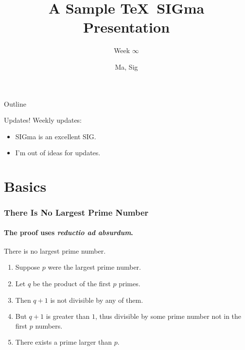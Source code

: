 \documentclass[aspectratio=169]{beamer}
\title{A Sample \TeX\ SIGma Presentation}
\subtitle{Week $\infty$}
\author{Ma, Sig}
\date{}
\begin{document}

\begin{frame}
\titlepage
\end{frame}

\begin{frame}{Outline}
  \tableofcontents
\end{frame}

\begin{frame}{Updates!}
  Weekly updates:
  \begin{itemize}
    \item SIGma is an excellent SIG.
    \item I'm out of ideas for updates.
  \end{itemize}
\end{frame}

\section{Basics}
\frame{\sectionpage}

\begin{frame}
  \frametitle{There Is No Largest Prime Number}
  \framesubtitle{The proof uses \textit{reductio ad absurdum}.}
  \begin{theorem}
    There is no largest prime number.
  \end{theorem}
  \begin{enumerate}
    \item<1-| alert@1> Suppose $p$ were the largest prime number.
    \item<2-> Let $q$ be the product of the first $p$ primes.
    \item<3-> Then $q+1$ is not divisible by any of them.
    \item<4-> But $q + 1$ is greater than $1$, thus divisible by some prime
    number not in the first $p$ numbers.
    \item<5-> There exists a prime larger than $p$.
  \end{enumerate}
\end{frame}
\end{document}
